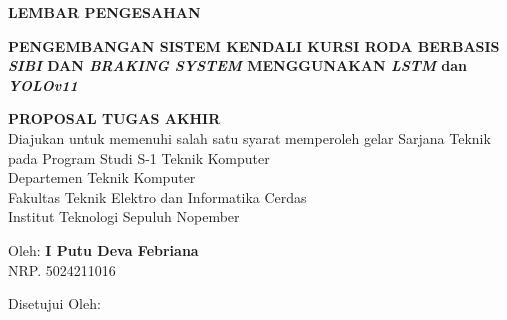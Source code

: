 \begin{center}
	\large
  \textbf{LEMBAR PENGESAHAN}
\end{center}
\thispagestyle{empty}

\begin{center}
  \textbf{PENGEMBANGAN SISTEM KENDALI KURSI RODA BERBASIS \emph{SIBI} DAN \emph{BRAKING SYSTEM} MENGGUNAKAN \emph{LSTM} dan \emph{YOLOv11}}
\end{center}

\begingroup
\small

\begin{center}
  \textbf{PROPOSAL TUGAS AKHIR} \\
  Diajukan untuk memenuhi salah satu syarat memperoleh gelar
  Sarjana Teknik pada
  Program Studi S-1 Teknik Komputer \\
  Departemen Teknik Komputer \\
  Fakultas Teknik Elektro dan Informatika Cerdas \\
  Institut Teknologi Sepuluh Nopember
\end{center}

\begin{center}
  Oleh: \textbf{I Putu Deva Febriana} \\
  NRP. 5024211016
\end{center}

\begin{center}
  Disetujui Oleh:
\end{center}

\vspace{3ex}

\begingroup
\setlength{\tabcolsep}{0pt}

